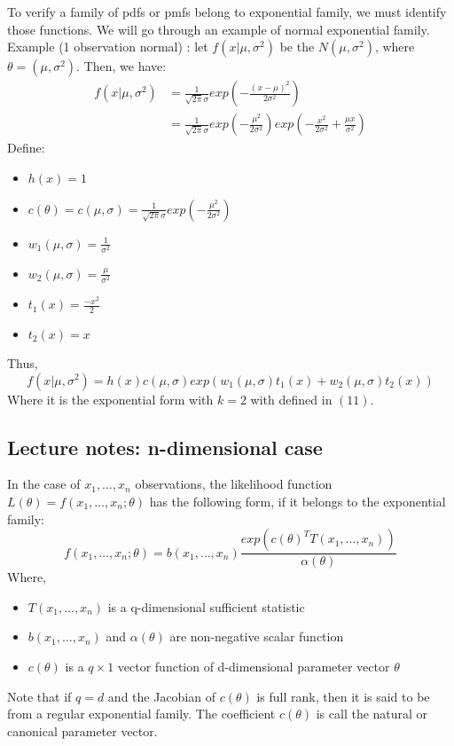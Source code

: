 \documentclass[12pt ]{article}
\begin{document}
To verify a family of pdfs or pmfs belong to exponential family, we must identify those functions. We will go through an example of normal exponential family. \\

Example (1 observation normal) : let $f(x|\mu,\sigma^2)$ be the $N(\mu, \sigma^2)$, where $\theta = (\mu, \sigma^2)$. Then, we have:
\begin{align*}
f(x|\mu,\sigma^2) &= \frac{1}{\sqrt{2\pi}\sigma} exp(-\frac{(x-\mu)^2}{2\sigma^2}) \\
&= \frac{1}{\sqrt{2\pi}\sigma} exp(-\frac{\mu^2}{2\sigma^2}) exp(-\frac{x^2}{2\sigma^2} + \frac{\mu x}{\sigma^2})
\end{align*}
Define:
\begin{itemize}
\item $h(x) = 1$
\item $c(\theta) = c(\mu, \sigma) = \frac{1}{\sqrt{2\pi}\sigma} exp(-\frac{\mu^2}{2\sigma^2})$
\item $w_{1}(\mu, \sigma) = \frac{1}{\sigma^2}$
\item $w_{2}(\mu, \sigma) = \frac{\mu}{\sigma^2}$
\item $t_{1}(x) = \frac{-x^2}{2}$
\item $t_{2}(x) = x$
\end{itemize}
Thus,
\begin{equation*}
f(x|\mu,\sigma^2) = h(x) c(\mu, \sigma) exp(w_{1}(\mu, \sigma) t_{1}(x) + w_{2}(\mu, \sigma)  t_{2}(x))
\end{equation*}
Where it is the exponential form with $k=2$ with defined in $(11)$.

\subsection{Lecture notes: n-dimensional case}
In the case of $x_{1}, \ldots, x_{n}$ observations, the likelihood function $L(\theta) = f(x_{1}, \ldots, x_{n}; \theta)$ has the following form, if it belongs to the exponential family:
\begin{equation}
f(x_{1}, \ldots, x_{n}; \theta) = b(x_{1}, \ldots, x_{n})\frac{exp(c(\theta)^T T(x_{1}, \ldots, x_{n}))}{\alpha(\theta)}
\end{equation}
Where,
\begin{itemize}
\item $T(x_{1}, \ldots, x_{n})$ is a q-dimensional sufficient statistic
\item $b(x_{1}, \ldots, x_{n})$ and $\alpha(\theta)$ are non-negative scalar function
\item $c(\theta)$ is a $q \times 1$ vector function of d-dimensional parameter vector $\theta$
\end{itemize}
Note that if $q=d$ and the Jacobian of $c(\theta)$ is full rank, then it is said to be from a regular exponential family. The coefficient $c(\theta)$ is call the natural or canonical parameter vector.
\end{document}
